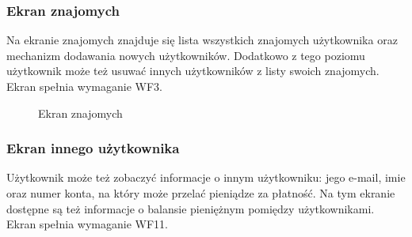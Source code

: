 \clearpage
\subsubsection{Ekran znajomych}
Na ekranie znajomych znajduje się lista wszystkich znajomych użytkownika oraz mechanizm dodawania nowych użytkowników. Dodatkowo z tego poziomu użytkownik może też usuwać innych użytkowników z listy swoich znajomych. Ekran spełnia wymaganie WF3.

\begin{figure}[h!]%
    \centering
    \qquad
    \caption{Ekran znajomych}%
\end{figure}

\clearpage
\subsubsection{Ekran innego użytkownika}
Użytkownik może też zobaczyć informacje o innym użytkowniku: jego e-mail, imie oraz numer konta, na który może przelać pieniądze za płatność. Na tym ekranie dostępne są też informacje o balansie pieniężnym pomiędzy użytkownikami. Ekran spełnia wymaganie WF11.

\begin{figure}[h!]%
    \centering
\end{figure}

